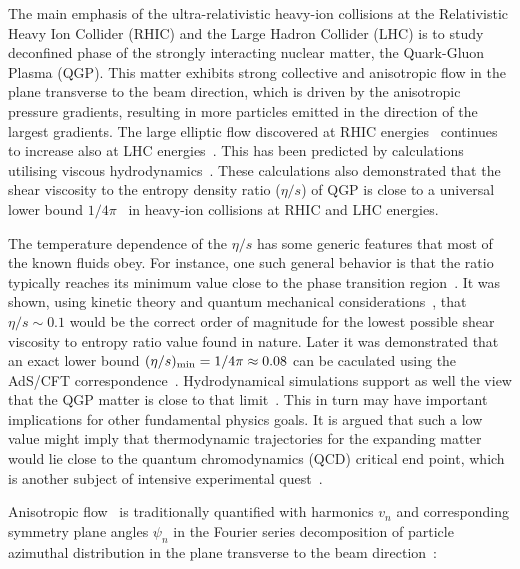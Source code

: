 \documentclass[ALICE,manyauthors]{cernphprep}
\begin{document}
The main emphasis of the ultra-relativistic heavy-ion collisions at the Relativistic Heavy Ion Collider (RHIC) and the Large Hadron Collider (LHC) is to study deconfined phase of the strongly interacting nuclear matter, the Quark-Gluon Plasma (QGP). 
This matter exhibits strong collective and anisotropic flow in the plane transverse to the beam direction, which is driven by the anisotropic pressure gradients, resulting in more particles emitted in the direction of the largest gradients.
The large elliptic flow discovered at RHIC energies~\cite{Ackermann:2000tr} continues to increase also at LHC energies~\cite{Aamodt:2010pa,Adam:2016izf}. This has been predicted by calculations utilising viscous hydrodynamics~\cite{Romatschke:2007mq,Shen:2011eg,Schenke:2011zz,Bozek:2012qs,Gale:2012rq,Hirano:2010je}.
These calculations also demonstrated that the shear viscosity to the entropy density ratio ($\eta/s$) of QGP is close to a universal lower bound $1/4\pi$~\cite{Kovtun:2004de} in heavy-ion collisions at RHIC and LHC energies.

The temperature dependence of the $\eta/s$ has some generic features that most of the known fluids obey. For instance, one such general behavior is that the ratio typically reaches its minimum value close to the phase transition region~\cite{Lacey:2006bc}. 
It was shown, using kinetic theory and quantum mechanical considerations~\cite{PhysRevD.31.53}, that $\eta/s\sim0.1$ would be the correct order of magnitude for the lowest possible shear viscosity to entropy ratio value found in nature. Later it was demonstrated that an exact lower bound $(\eta/s)_{\rm min}=1/4\pi\approx0.08$ can be caculated using the AdS/CFT correspondence~\cite{Kovtun:2004de}. Hydrodynamical simulations support as well the view that the QGP matter is close to that limit~\cite{Gale:2012rq}. This in turn may have important implications for other fundamental physics goals. It is argued that such a low value might imply that thermodynamic trajectories for the expanding matter would lie close to the quantum chromodynamics (QCD) critical end point, which is another subject of intensive experimental quest~\cite{Lacey:2006bc}.

Anisotropic flow~\cite{Ollitrault:1992bk} is traditionally quantified with harmonics $v_n$ and corresponding symmetry plane angles $\psi_n$ in the Fourier series decomposition of particle azimuthal distribution in the plane transverse to the beam direction~\cite{Voloshin:1994mz}:
\end{document}

